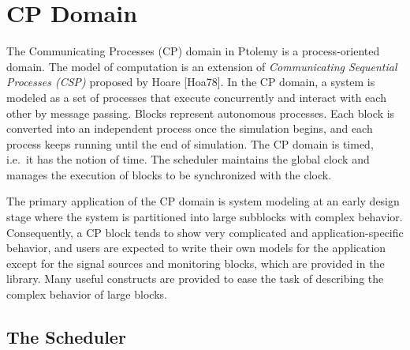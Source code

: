 
\begin{ifhtml}
\end{ifhtml}

\newcommand{\CP}{\PTOLEMY/src/domains/cp}
\newcommand{\IP}{\CP/infopad}

\begin{ifhtml}

\end{ifhtml}

\chapter{CP Domain}
\label{CP Domain}



The Communicating Processes (CP) domain
in Ptolemy is a
process-oriented domain.  The model of computation is an extension of
\emph{Communicating Sequential Processes (CSP)} proposed by Hoare
[Hoa78].  In the CP domain, a system is modeled as a set of
processes that execute concurrently and interact with each other by
message passing.  Blocks represent autonomous processes.  Each block is
converted into an independent process once the simulation begins, and
each process keeps running until the end of simulation.  The CP domain
is timed, i.e.\ it has the notion of time.
The scheduler maintains the global clock and manages the execution of
blocks to be synchronized with the clock.

The primary application of the CP domain is system modeling
 at an early
design stage where the system is partitioned into large subblocks with
complex behavior.  Consequently, a CP block tends to show very
complicated and application-specific behavior, and users are expected
to write their own models for the application except for the signal
sources and monitoring blocks, which are  provided in the library.
Many useful constructs are provided to ease the task of describing the
complex behavior of large blocks.

\section{The Scheduler}
\label{The CP Scheduler}

